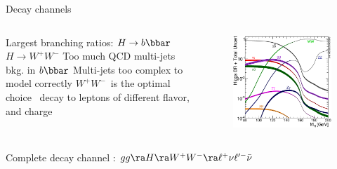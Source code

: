 \documentclass[10pt]{beamer}
\newcommand*{\HWWll}{\ensuremath{gg\ra H \ra W^+W^- \ra \ell^{+} \nu \ell'^{-} \bar{\nu}}}
\newcommand*{\WW}{\ensuremath{W^+W^-}} %
\begin{document}
\begin{frame}{Decay channels}
\begin{columns}
	\begin{column}{0.5\linewidth}
\begin{outline}
\1 Largest branching ratios:
	\2 $H\to b\bbar$
	\2 $H\to\WW$ 
\1 Too much QCD multi-jets bkg. in $b\bbar$
	\2 Multi-jets too complex to model correctly
\1 \WW\ is the optimal choice 
\1 \Wpm\ decay to leptons of different flavor, and charge
\end{outline}
	\end{column}
	\begin{column}{0.5\linewidth}
\begin{figure}
\centering
   \includegraphics[width=\textwidth]{figures/Higgs_BR_LM.eps}
\end{figure}
	\end{column}
\end{columns}
\centering
{\color{blue}\large Complete decay channel : \HWWll} 
\end{frame}
\end{document}
